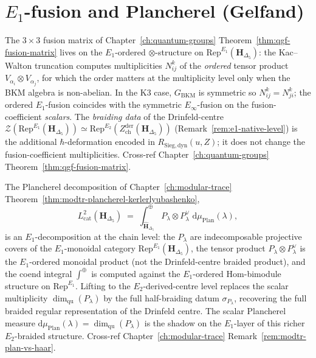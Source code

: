 \section{\texorpdfstring{$E_1$}{E-1}-fusion and Plancherel (Gelfand)}
\label{sec:e1-plancherel-fusion}

\begin{remark}
\label{rem:e1-fusion-layer}
The $3\times 3$ fusion matrix of
Chapter~\ref{ch:quantum-groups}
Theorem~\ref{thm:qgf-fusion-matrix} lives on the $E_1$-ordered
$\otimes$-structure on $\mathrm{Rep}^{E_1}(\mathbf H_{\Delta_5})$: the
Kac--Walton truncation computes multiplicities $N_{ij}^k$ of the
\emph{ordered} tensor product $V_{\alpha_i}\otimes V_{\alpha_j}$,
for which the order matters at the multiplicity level
only when the BKM algebra is non-abelian. In the K3 case,
$G_{\mathrm{BKM}}$ is symmetric so $N_{ij}^k = N_{ji}^k$; the ordered
$E_1$-fusion coincides with the symmetric $E_\infty$-fusion on the
fusion-coefficient \emph{scalars}. The \emph{braiding data} of the
Drinfeld-centre $\mathcal Z(\mathrm{Rep}^{E_1}(\mathbf H_{\Delta_5}))
\simeq \mathrm{Rep}^{E_2}(Z^{\mathrm{der}}_{\mathrm{ch}}(\mathbf H_{\Delta_5}))$
(Remark~\ref{rem:e1-native-level}) is the additional
$\hbar$-deformation encoded in $R_{\mathrm{Sieg,dyn}}(u, Z)$; it does
not change the fusion-coefficient multiplicities. Cross-ref
Chapter~\ref{ch:quantum-groups}
Theorem~\ref{thm:qgf-fusion-matrix}.
\end{remark}

\begin{remark}
\label{rem:e1-plancherel}
The Plancherel decomposition of
Chapter~\ref{ch:modular-trace}
Theorem~\ref{thm:modtr-plancherel-kerlerlyubashenko},
\[
 L^2_{\mathrm{cat}}(\mathbf H_{\Delta_5})
 \;=\;
 \int^{\oplus}_{\widehat{\mathbf H}_{\Delta_5}}
 P_\lambda \otimes P_\lambda^\vee
 \;\mathrm d\mu_{\mathrm{Plan}}(\lambda),
\]
is an $E_1$-decomposition at the chain level: the $P_\lambda$ are
indecomposable projective covers of the
$E_1$-monoidal category
$\mathrm{Rep}^{E_1}(\mathbf H_{\Delta_5})$, the tensor product
$P_\lambda \otimes P_\lambda^\vee$ is the $E_1$-ordered monoidal product
(not the Drinfeld-centre braided product), and the coend integral
$\int^\oplus$ is computed against the $E_1$-ordered Hom-bimodule
structure on $\mathrm{Rep}^{E_1}$. Lifting to the
$E_2$-derived-centre level replaces the scalar multiplicity
$\dim_{\mathrm{qu}}(P_\lambda)$ by the full half-braiding datum
$\sigma_{P_\lambda}$, recovering the full braided regular representation
of the Drinfeld centre. The scalar Plancherel measure
$\mathrm d\mu_{\mathrm{Plan}}(\lambda) = \dim_{\mathrm{qu}}(P_\lambda)$
is the shadow on the $E_1$-layer of this richer $E_2$-braided structure.
Cross-ref Chapter~\ref{ch:modular-trace}
Remark~\ref{rem:modtr-plan-vs-haar}.
\end{remark}

